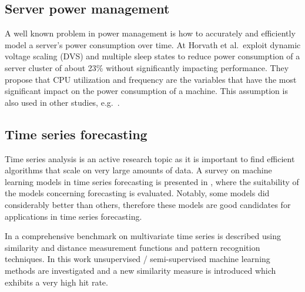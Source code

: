



\subsection{Server power management}

A well known problem in power management is how to accurately and efficiently model a server's power consumption over time. At \cite{horvath2008multi} Horvath et al.~exploit dynamic voltage scaling (DVS) and multiple sleep states to reduce power consumption of a server cluster of about 23\% without significantly impacting performance. They propose that CPU utilization and frequency are the variables that have the most significant impact on the power consumption of a machine. This assumption is also used in other studies, e.g.~\cite{rao2010minimizing, hammadi2014survey, kliazovich2012greencloud}. 

\subsection{Time series forecasting}

Time series analysis is an active research topic as it is important to find efficient algorithms that scale on very large amounts of data. A survey on machine learning models in time series forecasting is presented in \cite{ahmed2010empirical}, where the suitability of the models concerning forecasting is evaluated. Notably, some models did considerably better than others, therefore these models are good candidates for applications in time series forecasting. 

In \cite{lin2012pattern} a comprehensive benchmark on multivariate time series is described using similarity and distance measurement functions and pattern recognition techniques. In this work unsupervised / semi-supervised machine learning methods are investigated and a new similarity measure is introduced which exhibits a very high hit rate. 

